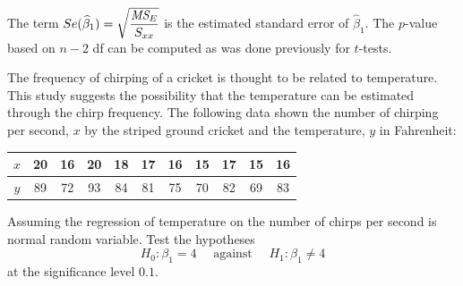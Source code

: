 The term $\displaystyle Se(\widehat{\beta}_1) = \sqrt{\frac{\textit{MS}_{E}}{S_{xx}}}$ is the 
estimated standard error of $\widehat{\beta}_1$. The $p$-value based on $n-2$ df can be computed as was done previously for $t$-tests.

\begin{example}
    The frequency of chirping of a cricket is thought to be related to temperature. This study 
    suggests the possibility that the temperature can be estimated through the chirp frequency. The 
    following data shown the number of chirping per second, $x$ by the striped ground cricket and the 
    temperature, $y$ in Fahrenheit:

    \begin{center}
        \begin{tabular}{c|cccccccccc}
            $x$ & 20 & 16 & 20 & 18 & 17 & 16 & 15 & 17 & 15 & 16\\
            \hline
            $y$ & 89 & 72 & 93 & 84 & 81 & 75 & 70 & 82 & 69 & 83\\
            \end{tabular}
    \end{center}
    Assuming the regression of temperature on the number of chirps per second is normal random variable. Test the 
    hypotheses
    \[
        H_0 : \beta_1 = 4 \quad \text{ against } \quad H_1 : \beta_1 \neq 4
    \]
    at the significance level $0.1$.
\end{example}

